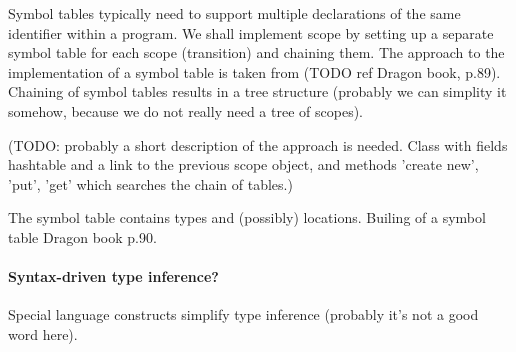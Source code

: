 Symbol tables typically need to support multiple declarations of the same identifier within a program. We shall implement scope by setting up a separate symbol table for each scope (transition) and chaining them. The approach to the implementation of a symbol table is taken from (TODO ref Dragon book, p.89). Chaining of symbol tables results in a tree structure (probably we can simplity it somehow, because we do not really need a tree of scopes).

(TODO: probably a short description of the approach is needed. Class with fields hashtable and a link to the previous scope object, and methods 'create new', 'put', 'get' which searches the chain of tables.)

The symbol table contains types and (possibly) locations. Builing of a symbol table Dragon book p.90.

  \paragraph{Syntax-driven type inference?}
Special language constructs simplify type inference (probably it's not a good word here).

